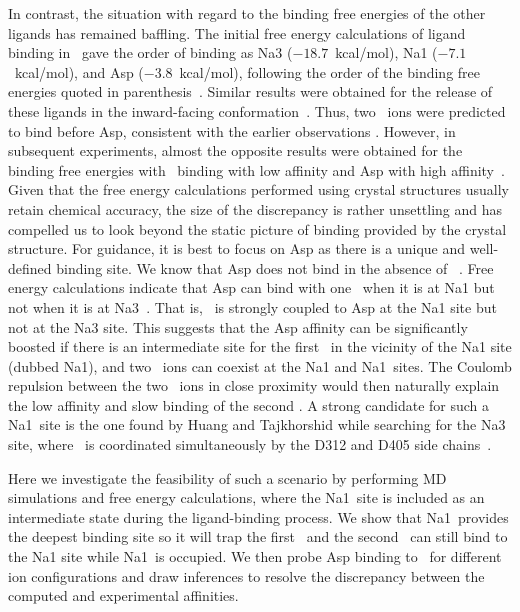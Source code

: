 In contrast, the situation with regard to the binding free energies of the other ligands has 
remained baffling. The initial free energy calculations of ligand binding in \GltPh\ gave the order 
of binding as Na3 ($-18.7$~kcal/mol), Na1 ($-7.1$~kcal/mol), and Asp ($-3.8$~kcal/mol), following 
the order of the binding free energies quoted in parenthesis~\cite{Heinzelmann2011}. Similar results 
were obtained for the release of these ligands in the inward-facing conformation~\cite{Heinzelmann2013}. 
Thus, two \Na\ ions were predicted to bind before Asp, consistent with the earlier observations 
\cite{Vandenberg2013,Tao2010}. However, in subsequent experiments, almost the opposite results were 
obtained for the binding free energies with \Na\ binding with low affinity and Asp with high 
affinity~\cite{Reyes2013b,Ewers2013,Hanelt2015}. Given that the free energy calculations performed using 
crystal structures usually retain chemical accuracy, the size of the discrepancy is rather unsettling 
and has compelled us to look beyond the static picture of binding provided by the crystal structure. 
For guidance, it is best to focus on Asp as there is a unique and well-defined binding site. We know 
that Asp does not bind in the absence of \Na\ \cite{Vandenberg2013}. Free energy calculations indicate that 
Asp can bind with one \Na\ when it is at Na1 but not when it is at Na3~\cite{Heinzelmann2013,Heinzelmann2011}. 
That is, \Na\ is strongly coupled to Asp at the Na1 site but not at the Na3 site. This suggests that the 
Asp affinity can be significantly boosted if there is an intermediate site for the first \Na\ in the 
vicinity of the Na1 site (dubbed Na1\prim), and two \Na\ ions can coexist at the Na1 and Na1\prim\ sites. 
The Coulomb repulsion between the two \Na\ ions in close proximity would then naturally explain the low 
affinity and slow binding of the second \Na. A strong candidate for such a Na1\prim\ site is the one 
found by Huang and Tajkhorshid while searching for the Na3 site, where \Na\ is coordinated simultaneously 
by the D312 and D405 side chains~\cite{Huang2010}. 

Here we investigate the feasibility of such a scenario by performing MD simulations and free energy 
calculations, where the Na1\prim\ site is included as an intermediate state during the ligand-binding 
process. We show that Na1\prim\ provides the deepest binding site so it will trap the first 
\Na\ and the second \Na\ can still bind to the Na1 site while Na1\prim\ is occupied. We then probe 
Asp binding to \GltPh\ for different ion configurations and draw inferences to resolve the discrepancy 
between the computed and experimental affinities.

